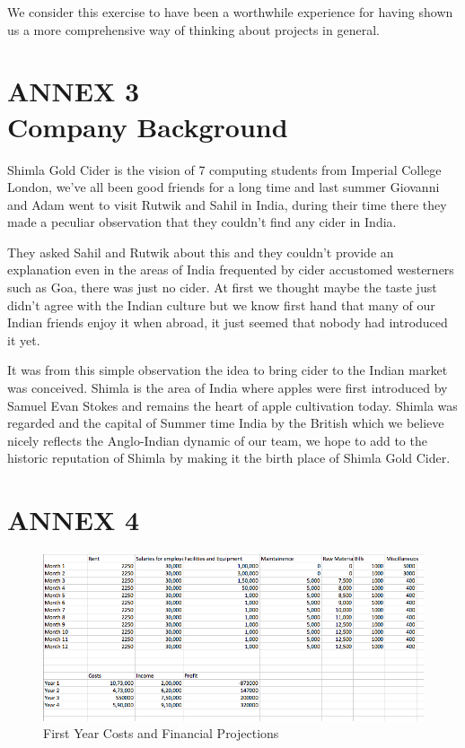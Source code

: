 \documentclass[11pt]{article}
\begin{document}
We consider this exercise to have been a worthwhile experience for having shown
us a more comprehensive way of thinking about projects in general.

\newpage


\section{ANNEX 3 \\ Company Background}
Shimla Gold Cider is the vision of 7 computing students from Imperial College
London, we've all been good friends for a long time and last summer Giovanni and
Adam went to visit Rutwik and Sahil in India, during their time there they made
a peculiar observation that they couldn't find any cider in India.

They asked Sahil and Rutwik about this and they couldn't provide an explanation
even in the areas of India frequented by cider accustomed westerners such as
Goa, there was just no cider. At first we thought maybe the taste just didn't 
agree with the Indian culture but we know first hand that many of our Indian 
friends enjoy it when abroad, it just seemed that nobody had introduced it yet.

It was from this simple observation the idea to bring cider to the Indian market
was conceived. Shimla is the area of India where apples were first introduced by
Samuel Evan Stokes and remains the heart of apple cultivation today. Shimla was
regarded and the capital of Summer time India by the British which we believe 
nicely reflects the Anglo-Indian dynamic of our team, we hope to add to the 
historic reputation of Shimla by making it the birth place of Shimla Gold Cider.

\newpage


\section{ANNEX 4}

\begin{figure}[H]
	\centering
	\caption{First Year Costs and Financial Projections}
	\includegraphics[width=\textwidth]{costs.png}
\end{figure}

\end{document}
